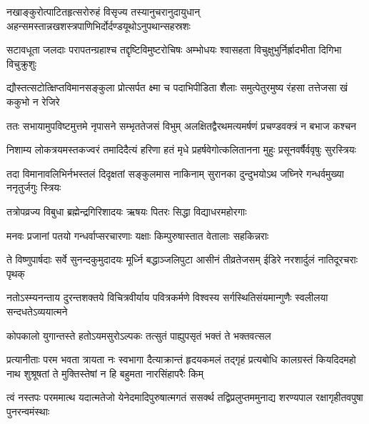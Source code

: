 \twolineshloka
{नखाङ्कुरोत्पाटितहृत्सरोरुहं विसृज्य तस्यानुचरानुदायुधान्}
{अहन्समस्तान्नखशस्त्रपाणिभिर्दोर्दण्डयूथोऽनुपथान्सहस्रशः} %

\twolineshloka
{सटावधूता जलदाः परापतन्ग्रहाश्च तद्दृष्टिविमुष्टरोचिषः}
{अम्भोधयः श्वासहता विचुक्षुभुर्निर्ह्रादभीता दिगिभा विचुक्रुशुः} %

\twolineshloka
{द्यौस्तत्सटोत्क्षिप्तविमानसङ्कुला प्रोत्सर्पत क्ष्मा च पदाभिपीडिता}
{शैलाः समुत्पेतुरमुष्य रंहसा तत्तेजसा खं ककुभो न रेजिरे} %

\twolineshloka
{ततः सभायामुपविष्टमुत्तमे नृपासने सम्भृततेजसं विभुम्}
{अलक्षितद्वैरथमत्यमर्षणं प्रचण्डवक्त्रं न बभाज कश्चन} %

\twolineshloka
{निशाम्य लोकत्रयमस्तकज्वरं तमादिदैत्यं हरिणा हतं मृधे}
{प्रहर्षवेगोत्कलितानना मुहुः प्रसूनवर्षैर्ववृषुः सुरस्त्रियः} %

\twolineshloka
{तदा विमानावलिभिर्नभस्तलं दिदृक्षतां सङ्कुलमास नाकिनाम्}
{सुरानका दुन्दुभयोऽथ जघ्निरे गन्धर्वमुख्या ननृतुर्जगुः स्त्रियः} %

\twolineshloka
{तत्रोपव्रज्य विबुधा ब्रह्मेन्द्रगिरिशादयः}
{ऋषयः पितरः सिद्धा विद्याधरमहोरगाः} %

\twolineshloka
{मनवः प्रजानां पतयो गन्धर्वाप्सरचारणाः}
{यक्षाः किम्पुरुषास्तात वेतालाः सहकिन्नराः} %

\threelineshloka
{ते विष्णुपार्षदाः सर्वे सुनन्दकुमुदादयः}
{मूर्ध्नि बद्धाञ्जलिपुटा आसीनं तीव्रतेजसम्}
{ईडिरे नरशार्दुलं नातिदूरचराः पृथक्} %




\twolineshloka
{नतोऽस्म्यनन्ताय दुरन्तशक्तये विचित्रवीर्याय पवित्रकर्मणे}
{विश्वस्य सर्गस्थितिसंयमान्गुणैः स्वलीलया सन्दधतेऽव्ययात्मने} %



\twolineshloka
{कोपकालो युगान्तस्ते हतोऽयमसुरोऽल्पकः}
{तत्सुतं पाह्युपसृतं भक्तं ते भक्तवत्सल} %



\fourlineindentedshloka
{प्रत्यानीताः परम भवता त्रायता नः स्वभागा}
{दैत्याक्रान्तं हृदयकमलं तद्गृहं प्रत्यबोधि}
{कालग्रस्तं कियदिदमहो नाथ शुश्रूषतां ते}
{मुक्तिस्तेषां न हि बहुमता नारसिंहापरैः किम्} %



\fourlineindentedshloka
{त्वं नस्तपः परममात्थ यदात्मतेजो}
{येनेदमादिपुरुषात्मगतं ससर्क्थ}
{तद्विप्रलुप्तममुनाद्य शरण्यपाल}
{रक्षागृहीतवपुषा पुनरन्वमंस्थाः} %



